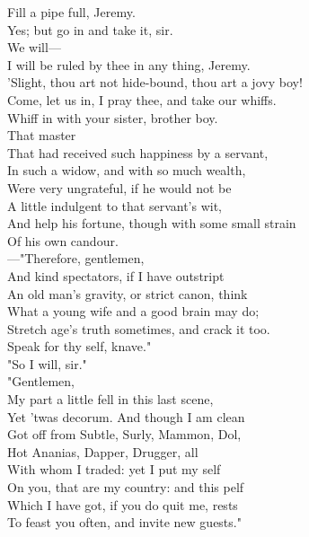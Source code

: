 \documentclass[a4paper,oneside]{memoir}
\begin{document}
\begin{drama*}
\lovewitspeaks {} Fill a pipe full, Jeremy.\\
\facespeaks Yes; but go in and take it, sir.\\
\lovewitspeaks {} We will---\\
I will be ruled by thee in any thing, Jeremy.\\
\kastrilspeaks 'Slight, thou art not hide-bound, thou art a jovy boy!\\
Come, let us in, I pray thee, and take our whiffs.\\
\lovewitspeaks Whiff in with your sister, brother boy.\\
 That master\\
That had received such happiness by a servant,\\
In such a widow, and with so much wealth,\\
Were very ungrateful, if he would not be\\
A little indulgent to that servant's wit,\\
And help his fortune, though with some small strain\\
Of his own candour.\\
 ---"Therefore, gentlemen,\\
And kind spectators, if I have outstript\\
An old man's gravity, or strict canon, think\\
What a young wife and a good brain may do;\\
Stretch age's truth sometimes, and crack it too.\\
Speak for thy self, knave."\\
\facespeaks {} "So I will, sir."\\
 "Gentlemen,\\
My part a little fell in this last scene,\\
Yet 'twas decorum. And though I am clean\\
Got off from Subtle, Surly, Mammon, Dol,\\
Hot Ananias, Dapper, Drugger, all\\
With whom I traded: yet I put my self\\
On you, that are my country: and this pelf\\
Which I have got, if you do quit me, rests\\
To feast you often, and invite new guests."\\

\end{drama*}
\end{document}
